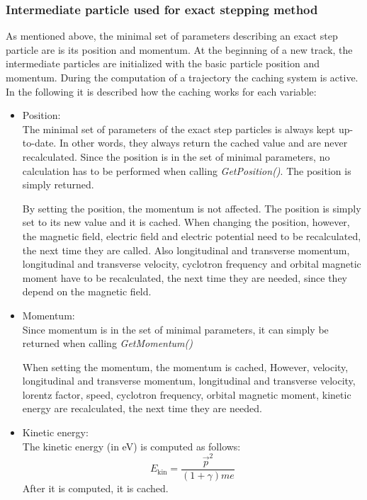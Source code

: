     \subsubsection*{Intermediate particle used for exact stepping method}
    As mentioned above, the minimal set of parameters describing an exact step particle are is its position and momentum.
	At the beginning of a new track, the intermediate particles are initialized with the basic particle position and momentum.
    During the computation of a trajectory the caching system is active. In the following it is described how the caching works for each variable:

	\begin{itemize}
		\item Position: \\
		The minimal set of parameters of the exact step particles is always kept up-to-date. In other words, they always return the cached value and are never recalculated. Since the position is in the set of minimal parameters, no calculation has to be performed when calling \textit{GetPosition()}. The position is simply returned.
		
		By setting the position, the momentum is not affected. The position is simply set to its new value and it is cached.
		When changing the position, however, the magnetic field, electric field and electric potential need to be recalculated, the next time they are called.
		Also longitudinal and transverse momentum, longitudinal and transverse velocity, cyclotron frequency and orbital magnetic moment have to be recalculated, the next time they are needed, since they depend on the magnetic field.

		\item Momentum: \\
		Since momentum is in the set of minimal parameters, it can simply be returned when calling \textit{GetMomentum()}
		
		When setting the momentum, the momentum is cached, However, velocity, longitudinal and transverse momentum, longitudinal and transverse velocity, lorentz factor, speed, cyclotron frequency, orbital magnetic moment, kinetic energy are recalculated, the next time they are needed.
    
		\item Kinetic energy:\\
		The kinetic energy (in eV) is computed as follows:
		\begin{equation}
			E_{\mathrm{kin}} = \frac{\vec{p}^2}{(1+\gamma) m e}
		\end{equation}
		After it is computed, it is cached.
		

\end{itemize}
